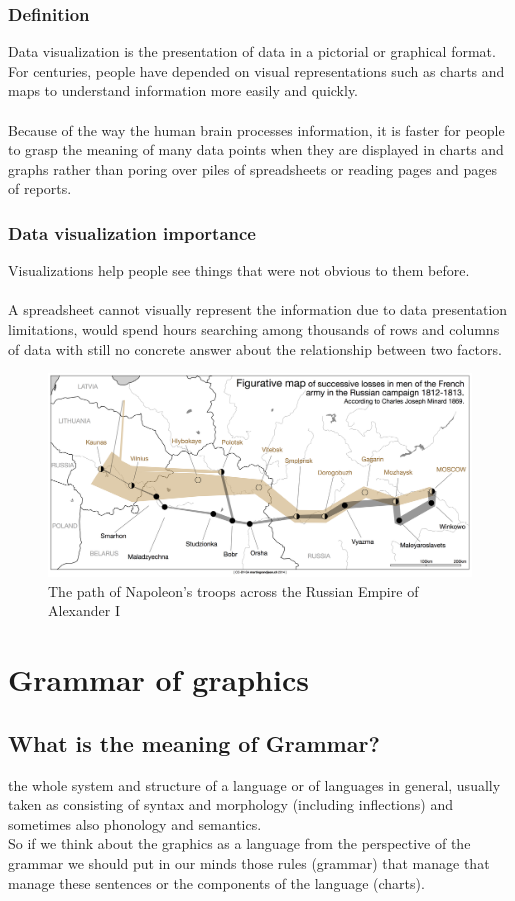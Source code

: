 \documentclass[12pt]{article}
\begin{document}
\subsubsection{Definition}
Data visualization is the presentation of data in a pictorial or graphical format. For centuries, people have depended on visual representations such as charts and maps to understand information more easily and quickly. \\ \\
Because of the way the human brain processes information, it is faster for people to grasp the meaning of many data points when they are displayed in charts and graphs rather than poring over piles of spreadsheets or reading pages and pages of reports.
\\
\subsubsection{Data visualization importance}
Visualizations help people see things that were not obvious to them before. \\ \\
A spreadsheet cannot visually represent the information due to data presentation limitations, would spend hours searching among thousands of rows and columns of data with still no concrete answer about the relationship between two factors.
\\
\begin{figure}[h!]
\caption{The path of Napoleon's troops across the Russian Empire of Alexander I}
\includegraphics[width=\textwidth]{Minard2Geo2}

\end{figure}
\newpage
\section{Grammar of graphics}
\subsection{What is the meaning of Grammar?}
the whole system and structure of a language or of languages in general, usually taken as consisting of syntax and morphology (including inflections) and sometimes also phonology and semantics. \\
So if we think about the graphics as a language from the perspective of the grammar we should put in our minds those rules (grammar) that manage that manage these sentences or the components of the language (charts). \\
\end{document}
